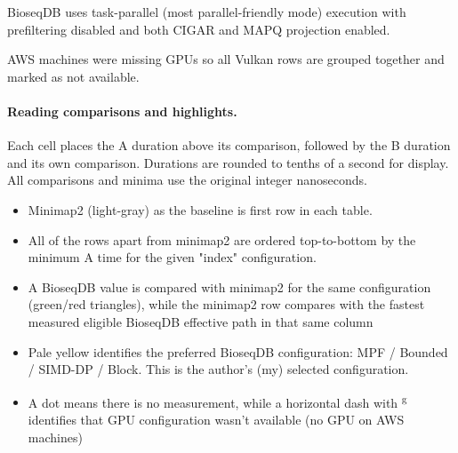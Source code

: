 BioseqDB uses task-parallel (most parallel-friendly mode) execution with prefiltering disabled and both CIGAR
and MAPQ projection enabled. 

AWS machines were missing GPUs so all Vulkan rows are grouped together and marked as not available.

\paragraph{Reading comparisons and highlights.}
Each cell places the A duration above its comparison, followed by the B duration
and its own comparison. Durations are rounded to tenths of a second for display.
All comparisons and minima use the original integer nanoseconds.
\begin{itemize}
  \item Minimap2 (light-gray) as the baseline is first row in each table. 
  \item All of the rows apart from minimap2 are ordered top-to-bottom by the minimum A time for the given "index" configuration.
  \item A BioseqDB value is compared with minimap2 for the same configuration (green/red triangles), while the minimap2 row compares with the fastest
  measured eligible BioseqDB effective path in that same column
  \item Pale yellow
  identifies the preferred BioseqDB configuration: MPF / Bounded / SIMD-DP /
  Block. This is the author's (my) selected configuration.
  \item A dot means there is no measurement, while a horizontal dash with \textsuperscript{g} identifies that GPU configuration wasn't available (no GPU on AWS machines)
\end{itemize}




